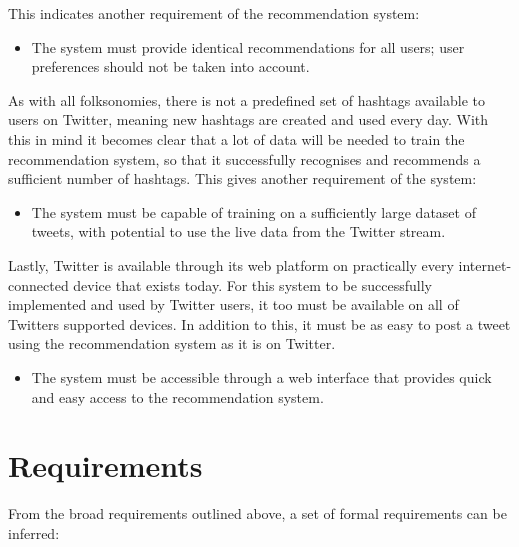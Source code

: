 \documentclass[11pt,a4paper]{report}
\begin{document}
This indicates another requirement of the recommendation system:
\begin{itemize}
    \item The system must provide identical recommendations for all users; user preferences should not be taken into account.
\end{itemize}

As with all folksonomies, there is not a predefined set of hashtags available to users on Twitter, meaning new hashtags are created and used every day. With this in mind it becomes clear that a lot of data will be needed to train the recommendation system, so that it successfully recognises and recommends a sufficient number of hashtags. This gives another requirement of the system:
\begin{itemize}
    \item The system must be capable of training on a sufficiently large dataset of tweets, with potential to use the live data from the Twitter stream.
\end{itemize}

Lastly, Twitter is available through its web platform on practically every internet-connected device that exists today. For this system to be successfully implemented and used by Twitter users, it too must be available on all of Twitters supported devices. In addition to this, it must be as easy to post a tweet using the recommendation system as it is on Twitter.
\begin{itemize}
    \item The system must be accessible through a web interface that provides quick and easy access to the recommendation system.
\end{itemize}

\section{Requirements}
From the broad requirements outlined above, a set of formal requirements can be inferred:
\end{document}
